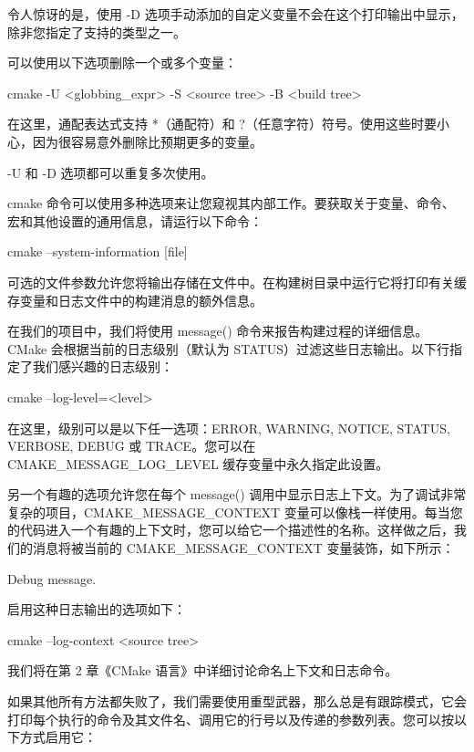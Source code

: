 令人惊讶的是，使用 -D 选项手动添加的自定义变量不会在这个打印输出中显示，除非您指定了支持的类型之一。

可以使用以下选项删除一个或多个变量：

\begin{shell}
cmake -U <globbing_expr> -S <source tree> -B <build tree>
\end{shell}
在这里，通配表达式支持 *（通配符）和 ?（任意字符）符号。使用这些时要小心，因为很容易意外删除比预期更多的变量。

-U 和 -D 选项都可以重复多次使用。


cmake 命令可以使用多种选项来让您窥视其内部工作。要获取关于变量、命令、宏和其他设置的通用信息，请运行以下命令：

\begin{shell}
cmake --system-information [file]
\end{shell}

可选的文件参数允许您将输出存储在文件中。在构建树目录中运行它将打印有关缓存变量和日志文件中的构建消息的额外信息。

在我们的项目中，我们将使用 message() 命令来报告构建过程的详细信息。CMake 会根据当前的日志级别（默认为 STATUS）过滤这些日志输出。以下行指定了我们感兴趣的日志级别：

\begin{shell}
cmake --log-level=<level>
\end{shell}

在这里，级别可以是以下任一选项：ERROR, WARNING, NOTICE, STATUS, VERBOSE, DEBUG 或 TRACE。您可以在 CMAKE\_MESSAGE\_LOG\_LEVEL 缓存变量中永久指定此设置。

另一个有趣的选项允许您在每个 message() 调用中显示日志上下文。为了调试非常复杂的项目，CMAKE\_MESSAGE\_CONTEXT 变量可以像栈一样使用。每当您的代码进入一个有趣的上下文时，您可以给它一个描述性的名称。这样做之后，我们的消息将被当前的 CMAKE\_MESSAGE\_CONTEXT 变量装饰，如下所示：

\begin{shell}
 Debug message.
\end{shell}

启用这种日志输出的选项如下：

\begin{shell}
cmake --log-context <source tree>
\end{shell}

我们将在第 2 章《CMake 语言》中详细讨论命名上下文和日志命令。

如果其他所有方法都失败了，我们需要使用重型武器，那么总是有跟踪模式，它会打印每个执行的命令及其文件名、调用它的行号以及传递的参数列表。您可以按以下方式启用它：

